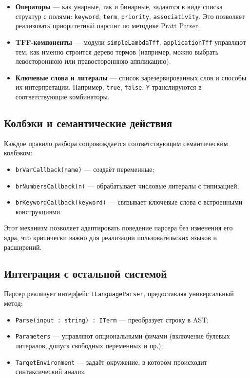 \begin{itemize}
  \item \textbf{Операторы} — как унарные, так и бинарные, задаются в виде списка структур с полями: \texttt{keyword}, \texttt{term}, \texttt{priority}, \texttt{associativity}. Это позволяет реализовать приоритетный парсинг по методике Pratt Parser.
  \item \textbf{TFF-компоненты} — модули \texttt{simpleLambdaTff}, \texttt{applicationTff} управляют тем, как именно строится дерево термов (например, можно выбрать левостороннюю или правостороннюю аппликацию).
  \item \textbf{Ключевые слова и литералы} — список зарезервированных слов и способы их интерпретации. Например, \texttt{true}, \texttt{false}, \texttt{Y} транслируются в соответствующие комбинаторы.
\end{itemize}

\subsection{Колбэки и семантические действия}

Каждое правило разбора сопровождается соответствующим семантическим колбэком:

\begin{itemize}
  \item \texttt{brVarCallback(name)} — создаёт переменные;
  \item \texttt{brNumbersCallback(n)} — обрабатывает числовые литералы с типизацией;
  \item \texttt{brKeywordCallback(keyword)} — связывает ключевые слова с встроенными конструкциями.
\end{itemize}

Этот механизм позволяет адаптировать поведение парсера без изменения его ядра, что критически важно для реализации пользовательских языков и расширений.

\subsection{Интеграция с остальной системой}

Парсер реализует интерфейс \texttt{ILanguageParser}, предоставляя универсальный метод:

\begin{itemize}
  \item \texttt{Parse(input : string) : ITerm} — преобразует строку в AST;
  \item \texttt{Parameters} — управляют опциональными фичами (включение булевых литералов, допуск свободных переменных и пр.);
  \item \texttt{TargetEnvironment} — задаёт окружение, в котором происходит синтаксический анализ.
\end{itemize}

